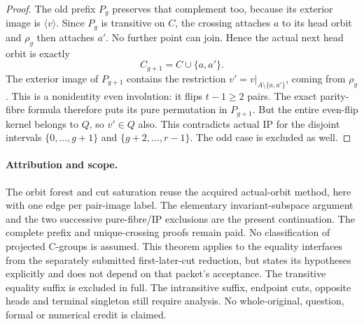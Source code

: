 \documentclass[11pt,a4paper]{article}
\newcommand{\gen}[1]{\langle#1\rangle}
\begin{document}
\begin{proof}
The old prefix $P_g$ preserves that complement too, because
its exterior image is $\gen v$. Since $P_g$ is transitive
on $C$, the crossing attaches $a$ to its head orbit and
$\rho_g$ then attaches $a'$. No further point can join.
Hence the actual next head orbit is exactly
\[
                         C_{g+1}=C\cup\{a,a'\}.
\]
The exterior image of $P_{g+1}$ contains the restriction
$v'=v|_{A\setminus\{a,a'\}}$, coming from $\rho_g$.
This is a nonidentity even involution: it flips $t-1\ge2$
pairs. The exact parity-fibre formula therefore puts its
pure permutation in $P_{g+1}$. But the entire even-flip kernel
belongs to $Q$, so $v'\in Q$ also. This contradicts actual
IP for the disjoint intervals $\{0,\ldots,g+1\}$ and
$\{g+2,\ldots,r-1\}$. The odd case is excluded as well.
\end{proof}

\paragraph{Attribution and scope.}
The orbit forest and cut saturation reuse the acquired actual-orbit
method, here with one edge per pair-image label. The elementary
invariant-subspace argument and the two successive pure-fibre/IP
exclusions are the
present continuation. The complete prefix and unique-crossing proofs
remain paid. No classification of projected C-groups is assumed.
This theorem applies to the equality interfaces from the separately
submitted first-later-cut reduction, but states its hypotheses
explicitly and does not depend on that packet's acceptance.
The transitive equality suffix is excluded in full. The intransitive
suffix, endpoint cuts, opposite heads and terminal singleton still
require analysis. No whole-original, question, formal or numerical credit
is claimed.
\end{document}
